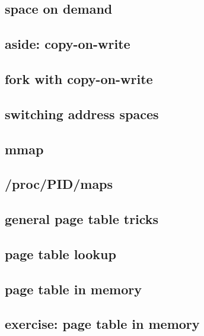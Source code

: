 \subsection{space on demand}


\subsection{aside: copy-on-write}


\subsection{fork with copy-on-write}


\subsection{switching address spaces}


\subsection{mmap}


\subsection{/proc/PID/maps}



\subsection{general page table tricks}


\subsection{page table lookup}


\subsection{page table in memory}



\subsection{exercise: page table in memory}

